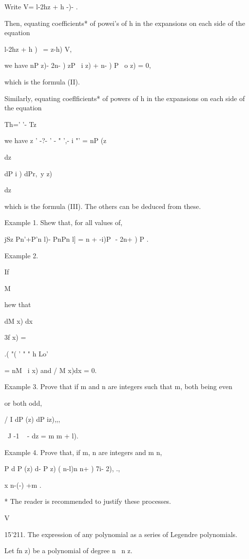 {Write V= l-2hz + h -)- .

Then, equating coefficients* of powei's of h in the expansions on each
side of the equation

 l-2hz + h )~ = z-h) V,

we have nP z)- 2n- ) zP \ i z) + n- ) P \ o z) = 0,

which is the formula (II).

Similarly, equating coeflficients* of powers of h in the expansions on
each side of the equation

 Th=' '- Tz

we have z ' -?- ' - " ',- i "' = nP (z\

dz

dP i ) dPr,\ y z)

dz

which is the formula (III). The others can be deduced from these.

Example 1. Shew that, for all values of,


jSz Pn'+P'n l)- PnPn l] = n + -i)P\ \,- 2n+ ) P .

Example 2.

If

M

hew that

dM x) dx

3f x) =

.( "( ' " " h Lo'

= nM \ i x) and / M x)dx = 0. 

Example 3. Prove that if m and n are integers such that m, both being
even

or both odd,

/ I dP (z) dP iz),,,

\ J -1 ~ - dz = m m + l). 

Example 4. Prove that, if m, n are integers and m n,

P d P (z) d- P z) ( n-l)n n+ ) 7i- 2), .,

x n-(-) +m .

 * The reader is recommended to justify these
processes.

V

%
%

15'211. The expression of any polynomial as a series of Legendre
polynomials.

Let fn z) be a polynomial of degree n \ n z.

}
